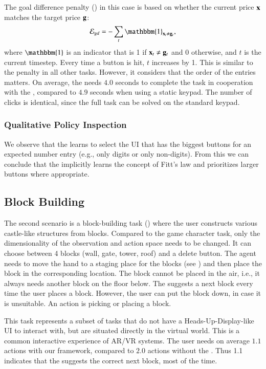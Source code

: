 The goal difference penalty () in this case is based on whether the current price $\mathbf{x}$ matches the target price $\mathbf{g}$: 
\begin{equation}
    \error_{gd} = -\sum_t\mathbbm{1}_{\tools_t \neq \gattr_t},
\end{equation}
where $\mathbbm{1}$ is an indicator that is 1 if $\mathbf{x}_t \neq \mathbf{g}_t$ and $0$ otherwise, and $t$ is the current timestep. Every time a button is hit, $t$ increases by 1. This is similar to the penalty in all other tasks. However, it considers that the order of the entries matters. On average, the \useragent needs $4.0$ seconds to complete the task in cooperation with the \interfaceagent, compared to $4.9$ seconds when using a static keypad. The number of clicks is identical, since the full task can be solved on the standard keypad.

\subsubsection*{Qualitative Policy Inspection} We observe that the \interfaceagent learns to select the UI that has the biggest buttons for an expected number entry (e.g., only digits or only non-digits). From this we can conclude that the \interfaceagent implicitly learns the concept of Fitt's law and prioritizes larger buttons where appropriate. 

\subsection{Block Building}
\label{sec:building}
The second scenario is a block-building task () where the user constructs various castle-like structures from blocks. Compared to the game character task, only the dimensionality of the observation and action space needs to be changed. It can choose between 4 blocks (wall, gate, tower, roof) and a delete button. The agent needs to move the hand to a staging place for the blocks (see ) and then place the block in the corresponding location. The block cannot be placed in the air, i.e., it always needs another block on the floor below. The \interfaceagent suggests a next block every time the user places a block. However, the user can put the block down, in case it is unsuitable. An action is picking or placing a block. 

This task represents a subset of tasks that do not have a Heads-Up-Display-like UI to interact with, but are situated directly in the virtual world. This is a common interactive experience of AR/VR systems. The user needs on average $1.1$ actions with our framework, compared to $2.0$ actions without the \interfaceagent. Thus 1.1 indicates that the \interfaceagent suggests the correct next block, most of the time. 

